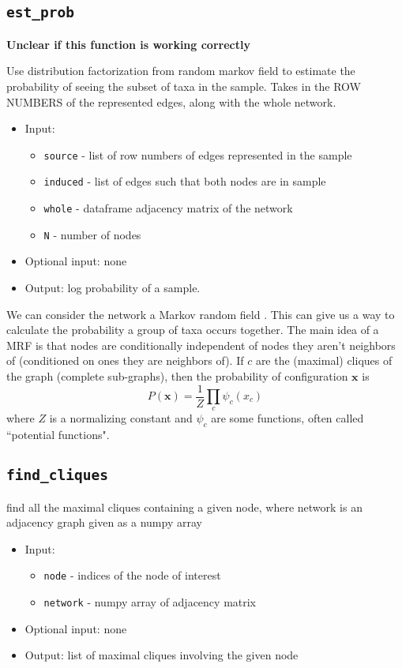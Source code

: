 \documentclass[10pt]{article}
\theoremstyle{definition}
\numberwithin{theorem}{section}
\numberwithin{definition}{section}
\numberwithin{lemma}{section}
\numberwithin{corollary}{section}
\numberwithin{clm}{section}
\numberwithin{rmk}{section}
\renewcommand{\b}{\bm}
\begin{document}
\cprotect \subsection{\verb|est_prob|}
{\bf Unclear if this function is working correctly}

Use distribution factorization from random markov field to estimate the probability of
seeing the subset of taxa in the sample. Takes in the ROW NUMBERS of the represented edges,
along with the whole network.
\begin{itemize}
	\item Input: 
	\begin{itemize}
		\item \verb|source| - list of row numbers of edges represented in the sample
		\item \verb|induced| - list of edges such that both nodes are in sample
		\item \verb|whole| - dataframe adjacency matrix of the network
		\item \verb|N| - number of nodes
	\end{itemize}
	\item Optional input: none
	\item Output: log probability of a sample.
\end{itemize}

We can consider the network a Markov random field \cite{machine_learning}. This can give us a way to calculate the probability a group of taxa occurs together. The main idea of a MRF is that nodes are conditionally independent of nodes they aren't neighbors of (conditioned on ones they are neighbors of). If $c$ are the (maximal) cliques of the graph (complete sub-graphs), then the probability of configuration $\b{x}$ is
\[
P(\b{x}) = \frac{1}{Z} \prod_{c} \psi_c (x_{c})
\]	
where $Z$ is a normalizing constant and $\psi_c$ are some functions, often called ``potential functions"\cite{machine_learning}.

\cprotect \subsection{\verb|find_cliques|}
find all the maximal cliques containing a given node, where network is an adjacency graph
given as a numpy array

\begin{itemize}
	\item Input: 
	\begin{itemize}
		\item \verb|node| - indices of the node of interest
		\item \verb|network| - numpy array of adjacency matrix
	\end{itemize}
	\item Optional input: none
	\item Output: list of maximal cliques involving the given node
\end{itemize}
\end{document}

